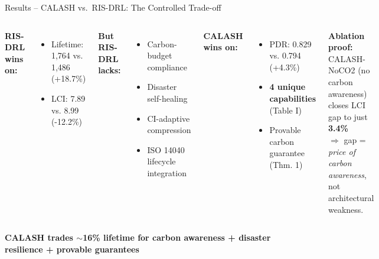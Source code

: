 \documentclass[aspectratio=169, 11pt]{beamer}
\newcommand{\xmark}{\textcolor{alertred}{--}}
\begin{document}
\begin{frame}{Results -- CALASH vs.\ RIS-DRL: The Controlled Trade-off}
\begin{columns}[T]
\textbf{RIS-DRL wins on:}
\begin{itemize}
    \item Lifetime: 1,764 vs. 1,486 (+18.7\%)
    \item LCI: 7.89 vs. 8.99 (-12.2\%)
\end{itemize}

\vspace{2mm}
\textbf{But RIS-DRL lacks:}
\begin{itemize}
    \item[\xmark] Carbon-budget compliance
    \item[\xmark] Disaster self-healing
    \item[\xmark] CI-adaptive compression
    \item[\xmark] ISO 14040 lifecycle integration
\end{itemize}

\textbf{CALASH wins on:}
\begin{itemize}
    \item PDR: 0.829 vs. 0.794 (+4.3\%)
    \item \textbf{4 unique capabilities} (Table I)
    \item Provable carbon guarantee (Thm. 1)
\end{itemize}

\vspace{2mm}
\textbf{Ablation proof:}\\
CALASH-NoCO2 (no carbon awareness)\\closes LCI gap to just \textbf{3.4\%}\\
$\Rightarrow$ gap = \textit{price of carbon awareness},\\ not architectural weakness.
\end{columns}

\vspace{4mm}
\centering
\textcolor{calash}{\textbf{CALASH trades $\sim$16\% lifetime for carbon awareness + disaster resilience + provable guarantees}}
\end{frame}
\end{document}
